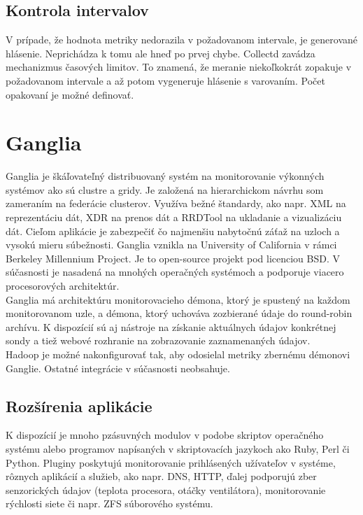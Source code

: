 \documentclass[11pt,final,oneside]{fithesis}
\begin{document}
\subsection{Kontrola intervalov}
V prípade, že hodnota metriky nedorazila v požadovanom intervale, je generované hlásenie. Neprichádza k tomu ale hneď po prvej chybe. Collectd zavádza mechanizmus časových limitov.
To znamená, že meranie niekoľkokrát zopakuje v požadovanom intervale a až potom vygeneruje hlásenie s varovaním. Počet opakovaní
je možné definovať. 

\section{Ganglia} 
Ganglia je škáľovateľný distribuovaný systém na monitorovanie výkonných systémov ako sú clustre a gridy. Je založená na hierarchickom návrhu 
som zameraním na federácie clusterov. Využíva bežné štandardy, ako napr. XML na reprezentáciu dát, XDR na prenos dát a RRDTool na
ukladanie a vizualizáciu dát.\cite{15} Cieľom aplikácie je zabezpečiť čo najmenšiu nabytočnú záťaž na uzloch a vysokú
mieru súbežnosti. Ganglia vznikla na University of California v rámci Berkeley Millennium Project. Je to open-source projekt
pod licenciou BSD. V súčasnosti je nasadená na mnohých operačných systémoch a podporuje viacero procesorových architektúr.
\\Ganglia má architektúru monitorovacieho démona, ktorý je spustený na každom monitorovanom uzle, a démona, ktorý uchováva zozbierané údaje do
round-robin archívu.
K dispozícií sú aj nástroje na získanie aktuálnych údajov konkrétnej sondy a tiež webové rozhranie na zobrazovanie zaznamenaných údajov.
\\Hadoop je možné nakonfigurovať tak, aby odosielal metriky zbernému démonovi Ganglie. Ostatné integrácie v súčasnosti neobsahuje.

\subsection{Rozšírenia aplikácie}
K dispozícií je mnoho pzásuvných modulov v podobe skriptov operačného systému alebo programov napísaných v skriptovacích jazykoch ako Ruby,
Perl či Python. Pluginy poskytujú monitorovanie prihlásených užívateľov v systéme, rôznych aplikácií a služieb, ako napr. DNS, HTTP, ďalej
podporujú zber senzorických údajov (teplota procesora, otáčky ventilátora), monitorovanie rýchlosti siete či napr. ZFS súborového systému.
\cite{16}
\end{document}
